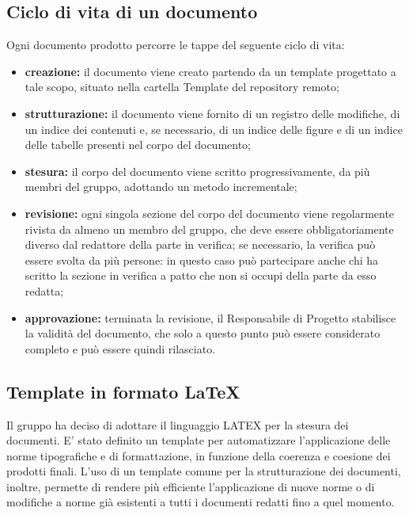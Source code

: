 \subsection{Ciclo di vita di un documento}
Ogni documento prodotto percorre le tappe del seguente ciclo di vita:
\begin{itemize}
\item \textbf{creazione:} il documento viene creato partendo da un template progettato a tale
	scopo, situato nella cartella Template del repository remoto;
	\item \textbf{strutturazione:} il documento viene fornito di un registro delle modifiche, di un indice dei   contenuti e, se necessario, di un indice delle figure e di un indice delle tabelle presenti nel corpo del documento;
		\item \textbf{stesura:} il corpo del documento viene scritto progressivamente, da più membri del gruppo, adottando un metodo incrementale;
			\item \textbf{revisione:} ogni singola sezione del corpo del documento viene regolarmente rivista da almeno un membro del gruppo, che deve essere obbligatoriamente diverso dal redattore della parte in verifica; se necessario, la verifica può essere svolta da più persone: in questo caso può partecipare anche chi ha scritto la sezione in verifica a patto che non si occupi della parte da esso redatta;
				\item \textbf{approvazione:} terminata la revisione, il Responsabile di Progetto stabilisce la validità del documento, che solo a questo punto può essere considerato completo e può essere quindi rilasciato.
\end{itemize} 
\subsection{Template in formato \LaTeX}
Il gruppo ha deciso di adottare il linguaggio LATEX per la stesura dei documenti. E' stato definito un template per automatizzare l’applicazione delle norme tipografiche e di formattazione, in funzione della coerenza e coesione dei prodotti finali.
L’uso di un template comune per la strutturazione dei documenti, inoltre, permette di rendere più efficiente l’applicazione di nuove norme o di modifiche a norme già esistenti a tutti i documenti redatti fino a quel momento.
